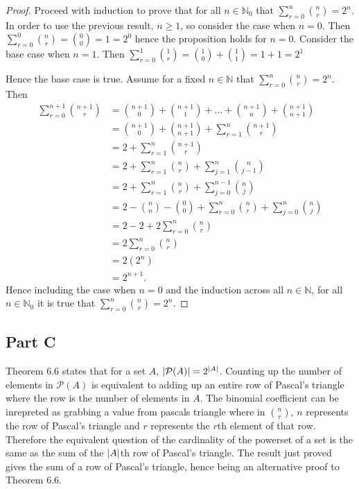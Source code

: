 \documentclass[12pt]{extarticle}
\newcommand{\powerset}[1]{\mathcal{P}(#1)}
\begin{document}
\begin{proof}
	Proceed with induction to prove that for all $n \in \mathbb{N}_0$ that $\displaystyle\sum_{r=0}^n \binom{n}{r} = 2^n$. In order to use the previous result, $n \geq 1$, so consider the case when $n=0$. Then
	$
	\displaystyle\sum_{r=0}^{0} \binom{n}{r} = \binom{0}{0} = 1 = 2^0
	$
	hence the proposition holds for $n=0$. Consider the base case when $n=1$. Then
		$\displaystyle\sum_{r=0}^{1} \binom{1}{r} = \binom{1}{0} + \binom{1}{1} = 1 + 1 = 2^1$

	Hence the base case is true. Assume for a fixed $n \in \mathbb{N}$ that $\displaystyle\sum_{r=0}^n \binom{n}{r} = 2^n$. Then
	\begin{align*}
		\sum_{r=0}^{n+1} \binom{n+1}{r} &= \binom{n+1}{0} + \binom{n+1}{1} + \ldots + \binom{n+1}{n} + \binom{n+1}{n+1} \\
		&= \binom{n+1}{0} + \binom{n+1}{n+1} + \sum_{r=1}^{n} \binom{n+1}{r} \\
		&= 2 + \sum_{r=1}^n \binom{n+1}{r} \\
		&= 2 + \sum_{r=1}^n \binom{n}{r} + \sum_{j=1}^n \binom{n}{j-1} \\
		&= 2 + \sum_{r=1}^n \binom{n}{r} + \sum_{j=0}^{n-1} \binom{n}{j} \\
		&= 2 - \binom{n}{n} - \binom{0}{0} + \sum_{r=0}^n \binom{n}{r} + \sum_{j=0}^{n} \binom{n}{j}\\
		&= 2 - 2 + 2\sum_{r=0}^n \binom{n}{r} \\
		&= 2\sum_{r=0}^n \binom{n}{r} \\
		&= 2(2^n) \\
		&= 2^{n+1}
	.\end{align*}
	Hence including the case when $n=0$ and the induction across all $n \in \mathbb{N}$, for all $n \in \mathbb{N}_0$ it is true that $\displaystyle\sum_{r=0}^n \binom{n}{r} = 2^n$.
\end{proof}

\subsection*{Part C}

Theorem 6.6 states that for a set $A$, $\qty|\powerset{A}| = 2^\qty|A|$. Counting up the number of elements in $\powerset{A}$ is equivalent to adding up an entire row of Pascal's triangle where the row is the number of elements in $A$. The binomial coefficient can be inrepreted as grabbing a value from pascals triangle where in $\binom{n}{r}$, $n$ represents the row of Pascal's triangle and $r$ represents the $r\text{th}$ element of that row. Therefore the equivalent question of the cardinality of the powerset of a set is the same as the sum of the $\qty|A|$th row of Pascal's triangle. The result just proved gives the sum of a row of Pascal's triangle, hence being an alternative proof to Theorem 6.6.
\end{document}
